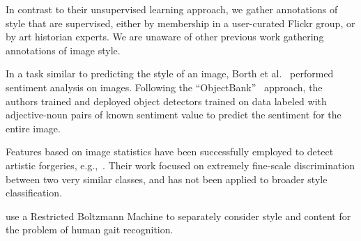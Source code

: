 In contrast to their unsupervised learning approach, we gather annotations of style that are supervised, either by membership in a user-curated Flickr group, or by art historian experts.
We are unaware of other previous work gathering annotations of image style.

In a task similar to predicting the style of an image, Borth et al.~\cite{Borth-MM-2013} performed sentiment analysis on images.
Following the ``ObjectBank''~\cite{Li-NIPS-2010} approach, the authors trained and deployed object detectors trained on data labeled with adjective-noun pairs of known sentiment value to predict the sentiment for the entire image.

Features based on image statistics have been successfully employed to detect artistic forgeries, e.g.,~\cite{Lyu-PNAS-2004}.
Their work focused on extremely fine-scale discrimination between two very similar classes, and has not been applied to broader style classification.


\cite{Taylor-ICML-2009} use a Restricted Boltzmann Machine to separately consider style and content for the problem of human gait recognition.



